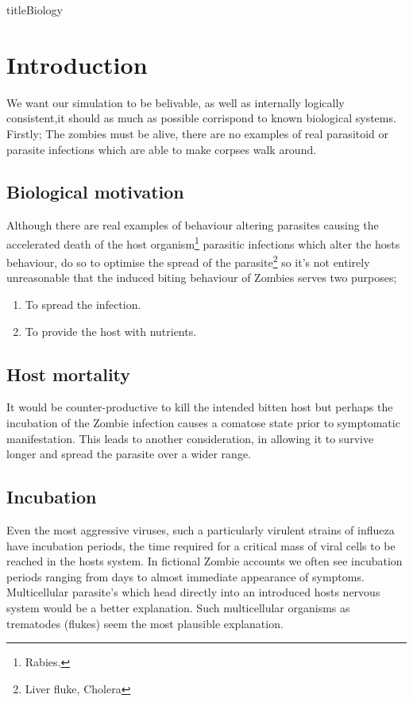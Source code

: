 \pagestyle{empty}
\setcounter{section}{2}

title{Biology}
\maketitle

\section{Introduction}
We want our simulation to be belivable, as well as internally logically consistent,it should as much as possible corrispond to known biological systems. Firstly; The zombies must be alive, there are no examples of real parasitoid or parasite infections which are able to make corpses walk around.

\subsection{Biological motivation}
Although there are real examples of behaviour altering parasites causing the accelerated death of the host organism\footnote{Rabies.} parasitic infections which alter the hosts behaviour, do so to optimise the spread of the parasite\footnote{Liver fluke, Cholera} so it's not entirely unreasonable that the induced biting behaviour of Zombies serves two purposes;\begin{enumerate}
\item To spread the infection.
\item To provide the host with nutrients.
\end{enumerate}
\subsection{Host mortality}
It would be counter-productive to kill the intended bitten host but perhaps the incubation of the Zombie infection causes a comatose state prior to symptomatic manifestation.
This leads to another consideration, in allowing it to survive longer and spread the parasite over a wider range.
\subsection{Incubation}
Even the most aggressive viruses, such a particularly virulent strains of influeza have incubation periods, the time required for a critical mass of viral cells to be reached in the hosts system. In fictional Zombie accounts we often see incubation periods ranging from days to almost immediate appearance of symptoms. Multicellular parasite's which head directly into an introduced hosts nervous system would be a better explanation. Such multicellular organisms as trematodes (flukes) seem the most plausible explanation.
